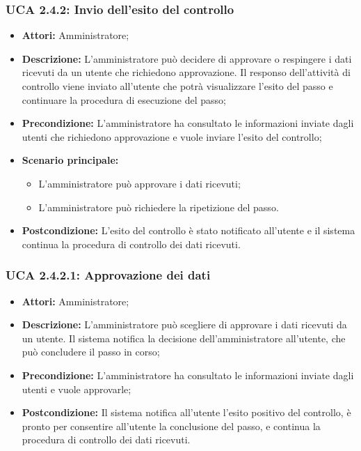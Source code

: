 \hypertarget{A2.4.2}{}
\subsubsection{UCA 2.4.2: Invio dell'esito del controllo}
\begin{itemize}
\item \textbf{Attori:}
 Amministratore;
\item \textbf{Descrizione:} 
L'amministratore può decidere di approvare o respingere i dati ricevuti da un utente che richiedono approvazione.
Il responso dell'attività di controllo viene inviato all'utente che potrà visualizzare l'esito del passo e continuare la procedura di esecuzione del passo;
\item \textbf{Precondizione:} 
L'amministratore ha consultato le informazioni inviate dagli utenti che richiedono approvazione e vuole inviare l'esito del controllo;
\item \textbf{Scenario principale:} 
\begin{itemize}
\item L'amministratore può approvare i dati ricevuti;
\item L'amministratore può richiedere la ripetizione del passo.
\end{itemize}
\item \textbf{Postcondizione:} 
L'esito del controllo è stato notificato all'utente e il sistema continua la procedura di controllo dei dati ricevuti.
\end{itemize}

\hypertarget{A2.4.2.1}{}
\subsubsection{UCA 2.4.2.1: Approvazione dei dati}
\begin{itemize}
\item \textbf{Attori:}
 Amministratore;
\item \textbf{Descrizione:} 
L'amministratore può scegliere di approvare i dati ricevuti da un utente. Il sistema notifica la decisione dell'amministratore all'utente, che può concludere il passo in corso;
\item \textbf{Precondizione:} 
L'amministratore ha consultato le informazioni inviate dagli utenti e vuole approvarle;
\item \textbf{Postcondizione:} 
Il sistema notifica all'utente l'esito positivo del controllo, è pronto per consentire all'utente la conclusione del passo, e continua la procedura di controllo dei dati ricevuti.
\end{itemize}

